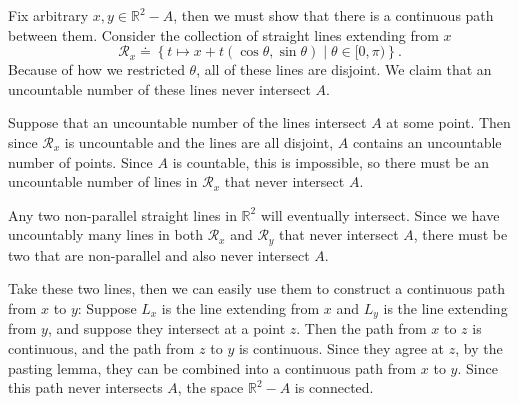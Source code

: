 \documentclass[10pt]{report}
\begin{document}
Fix arbitrary $x,y \in \mathbb{R}^2-A$, then we must show that there is a continuous path between them. Consider the collection of straight lines extending from $x$
\[
	\mathcal{R}_x \doteq \left\{ t \mapsto x+t(\cos \theta, \sin \theta) \;|\; \theta \in [0, \pi) \right\}.
\] Because of how we restricted $\theta$, all of these lines are disjoint. We claim that an uncountable number of these lines never intersect $A$.

Suppose that an uncountable number of the lines intersect $A$ at some point. Then since $\mathcal{R}_x$ is uncountable and the lines are all disjoint, $A$ contains an uncountable number of points. Since $A$ is countable, this is impossible, so there must be an uncountable number of lines in $\mathcal{R}_x$ that never intersect $A$.

Any two non-parallel straight lines in $\mathbb{R}^2$ will eventually intersect. Since we have uncountably many lines in both $\mathcal{R}_x$ and $\mathcal{R}_y$ that never intersect $A$, there must be two that are non-parallel and also never intersect $A$.

Take these two lines, then we can easily use them to construct a continuous path from $x$ to $y$: Suppose $L_x$ is the line extending from $x$ and $L_y$ is the line extending from $y$, and suppose they intersect at a point $z$. Then the path from $x$ to $z$ is continuous, and the path from $z$ to $y$ is continuous. Since they agree at $z$, by the pasting lemma, they can be combined into a continuous path from $x$ to $y$. Since this path never intersects $A$, the space $\mathbb{R}^2-A$ is connected.
\end{document}
